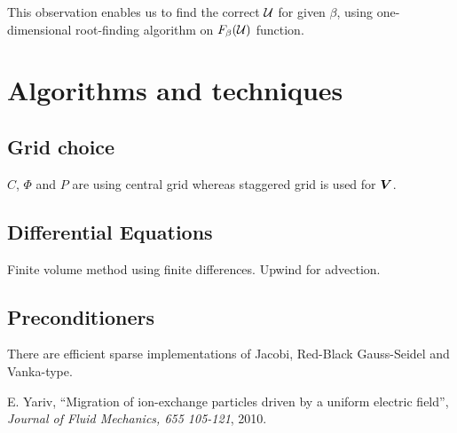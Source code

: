 \documentclass[11pt]{article}
\begin{document}
This observation enables us to find the correct $\cal{U}$ for given $\beta$, using one-dimensional root-finding algorithm on $F_\beta(\cal{U})$ function.

\section{Algorithms and techniques}

\subsection{Grid choice}
$C$, $\varPhi$ and $P$ are using central grid whereas staggered grid is used for $\boldsymbol{V}$.

\subsection{Differential Equations}
Finite volume method using finite differences.
Upwind for advection.

\subsection{Preconditioners}
There are efficient sparse implementations of 
Jacobi, Red-Black Gauss-Seidel and Vanka-type.

\begin{thebibliography}{}

 E. Yariv,
``Migration of ion-exchange particles driven by a uniform electric field'',
{\em Journal of Fluid Mechanics, 655 105-121}, 2010.

\end{thebibliography}
\end{document}
